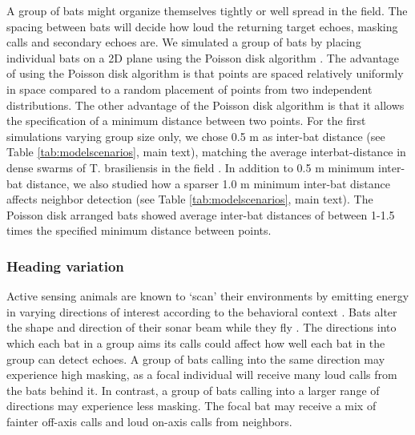 \documentclass[
]{book}
\begin{document}
A group of bats might organize themselves tightly or well spread in the field. The spacing between bats will decide how loud the returning target echoes, masking calls and secondary echoes are. We simulated a group of bats by placing individual bats on a 2D plane using the Poisson disk algorithm \citep{bridson2007a}. The advantage of using the Poisson disk algorithm is that points are spaced relatively uniformly in space compared to a random placement of points from two independent distributions. The other advantage of the Poisson disk algorithm is that it allows the specification of a minimum distance between two points. For the first simulations varying group size only, we chose 0.5 m as inter-bat distance (see Table \ref{tab:modelscenarios}, main text), matching the average interbat-distance in dense swarms of T. brasiliensis in the field \citep{theriault2010a}. In addition to 0.5 m minimum inter-bat distance, we also studied how a sparser 1.0 m minimum inter-bat distance affects neighbor detection (see Table \ref{tab:modelscenarios}, main text). The Poisson disk arranged bats showed average inter-bat distances of between 1-1.5 times the specified minimum distance between points.

\hypertarget{heading-variation}{%
\subsubsection{\texorpdfstring{Heading variation \label{cpn_headingvar}}{Heading variation }}\label{heading-variation}}

Active sensing animals are known to `scan' their environments by emitting energy
in varying directions of interest according to the behavioral context \citep[\citet{bullock2005a}]{wisniewska2015a}. Bats alter the shape and direction of their sonar beam while they fly \citep[\citet{ghose2006a}, \citet{w2017a}]{jakobsen2010a}. The directions into which each bat in a group aims its calls could affect how well each bat in the group can detect echoes. A group of bats calling into the same direction may experience high masking, as a focal individual will receive many loud calls from the bats behind it. In contrast, a group of bats calling into a larger range of directions may experience less masking. The focal bat may receive a mix of fainter off-axis calls and loud on-axis calls from neighbors.
\end{document}
